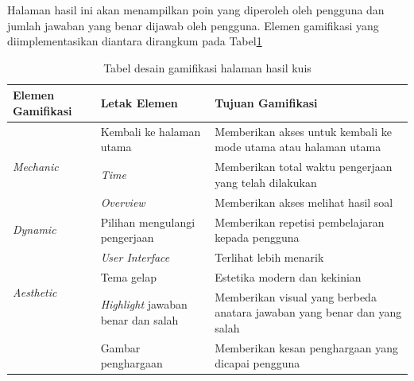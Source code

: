 Halaman hasil ini akan menampilkan poin yang diperoleh oleh pengguna dan jumlah jawaban yang benar dijawab oleh pengguna.
Elemen gamifikasi yang diimplementasikan diantara dirangkum pada Tabel\ref*{TabelGameHasilKuis}
\begin{table}[H]
	\caption{Tabel desain gamifikasi halaman hasil kuis}
	\label{TabelGameHasilKuis}
	\begin{tabular}{|m{3.6cm}|m{}|m{}|}
		\hline
		Elemen Gamifikasi& Letak Elemen & Tujuan Gamifikasi\\
		\hline
		\multirow{3}{1cm}{\textit{Mechanic}}&Kembali ke halaman utama& Memberikan akses untuk kembali ke mode utama atau halaman utama\\
		\cline{2-3}
		&\textit{Time}& Memberikan total waktu pengerjaan yang telah dilakukan\\
		\cline{2-3}
		&\textit{Overview}& Memberikan akses melihat hasil soal\\
		\hline
		\textit{Dynamic}&Pilihan mengulangi pengerjaan&Memberikan repetisi pembelajaran kepada pengguna \\
		\hline
		\multirow{3}{1cm}{\textit{Aesthetic}}&\textit{User Interface}&Terlihat lebih menarik\\
		\cline{2-3}
		& Tema gelap & Estetika modern dan kekinian \\
		\cline{2-3}
		&\textit{Highlight} jawaban benar dan salah& Memberikan visual yang berbeda anatara jawaban yang benar dan yang salah\\
		\cline{2-3}
		& Gambar penghargaan& Memberikan kesan penghargaan yang dicapai pengguna\\
		\hline
	\end{tabular}
\end{table}
